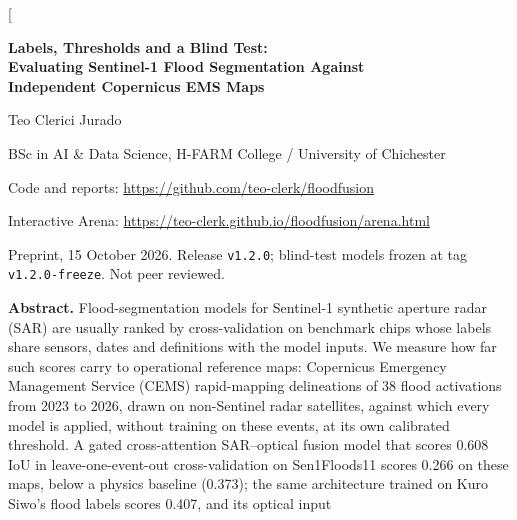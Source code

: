\documentclass[10pt,twocolumn,a4paper]{article}
\begin{document}
\twocolumn[{%
\begin{center}
  {\LARGE\bfseries Labels, Thresholds and a Blind Test:\\[3pt]
   Evaluating Sentinel-1 Flood Segmentation Against\\[3pt] Independent Copernicus EMS Maps\par}
  \vspace{9pt}
  {\large Teo Clerici Jurado\par}
  \vspace{2pt}
  {\small BSc in AI \& Data Science, H-FARM College / University of Chichester\par}
  \vspace{5pt}
  {\small Code and reports: \url{https://github.com/teo-clerk/floodfusion}\par}
  {\small Interactive Arena: \url{https://teo-clerk.github.io/floodfusion/arena.html}\par}
  \vspace{2pt}
  {\footnotesize Preprint, 15 October 2026. Release \texttt{v1.2.0}; blind-test models frozen at tag
   \texttt{v1.2.0-freeze}. Not peer reviewed.\par}
\end{center}
\vspace{2pt}
\begin{center}
\begin{minipage}{0.9\textwidth}
\small
\noindent\textbf{Abstract.}
Flood-segmentation models for Sentinel-1 synthetic aperture radar (SAR) are usually ranked by cross-validation on
benchmark chips whose labels share sensors, dates and definitions with the model inputs. We measure how far such
scores carry to operational reference maps: Copernicus Emergency Management Service (CEMS) rapid-mapping
delineations of 38 flood activations from 2023 to 2026, drawn on non-Sentinel radar satellites, against which every
model is applied, without training on these events, at its own calibrated threshold. A gated cross-attention SAR--optical fusion model that
scores 0.608 IoU in leave-one-event-out cross-validation on Sen1Floods11 scores 0.266 on these maps, below a physics
baseline (0.373); the same architecture trained on Kuro Siwo's flood labels scores 0.407, and its optical input

\end{minipage}
\end{center}}
\end{document}
